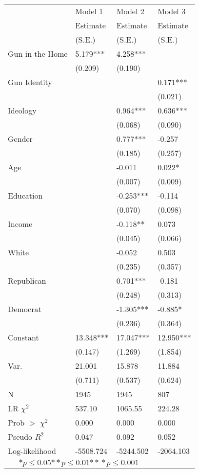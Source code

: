 \documentclass[a0,landscape]{a0poster}
\begin{document}
\begin{multicols}{4}
\begin{center}
\begin{tabular}{*{4}{l}}
     &  Model 1	&  Model 2 & Model 3\tabularnewline
   & Estimate & Estimate & Estimate \tabularnewline
    & (S.E.) & (S.E.)& (S.E.)\tabularnewline
 \hline
 \hline
  Gun in the Home    		& 5.179*** 	& 4.258*** 	& \tabularnewline
     										&  (0.209) 	&  (0.190) 		& \tabularnewline
  Gun Identity    			& 				 	&  						& 0.171***\tabularnewline
     										&  					&   					& (0.021)\tabularnewline
  Ideology    					&  					& 0.964*** 		& 0.636***\tabularnewline
     										&   				&  (0.068) 		& (0.090)\tabularnewline
  Gender    						&  					& 0.777*** 	  & -0.257\tabularnewline
     										&   				&  (0.185)  	& (0.257)\tabularnewline
  Age     							&  					& -0.011 		& 0.022*\tabularnewline
     										&   				&  (0.007)  	& (0.009)\tabularnewline
  Education     				&  				 	& -0.253***		& -0.114\tabularnewline
    										&  		 		 	&  (0.070)  	& (0.098)\tabularnewline
  Income    						&  					& -0.118**  	& 0.073\tabularnewline
     										&   				&  (0.045)  	& (0.066)\tabularnewline
	White									&						& -0.052			&	0.503\tabularnewline
												&						& (0.235)			&	(0.357)	\tabularnewline
  Republican    				&  					& 0.701*** 		& -0.181\tabularnewline
     										&   				&  (0.248)  	& (0.313)\tabularnewline
  Democrat     					&     			& -1.305*** 	& -0.885*\tabularnewline
     										&   				&  (0.236)  	& (0.364)\tabularnewline
  Constant	    				&	13.348*** &	17.047*** 	& 12.950***\tabularnewline
     										&  (0.147) 	&  (1.269) 		& (1.854)\tabularnewline
 \hline
  Var.					& 21.001		&		15.878						& 11.884\\
  	 						& (0.711) 	&  (0.537)						& (0.624)\\
\hline
 N 	 						& 1945 			& 1945  				& 807 \tabularnewline
 LR $\chi^2$    & 537.10   	& 1065.55   		& 224.28 \tabularnewline
 Prob $>$ $\chi^2$ & 0.000  & 0.000  				& 0.000  \tabularnewline
 Pseudo $R^2$   & 0.047   	& 0.092   			& 0.052 \tabularnewline
 Log-likelihood & -5508.724 & -5244.502   	& -2064.103 \tabularnewline
 \hline
\hline
 
 \multicolumn{3}{c}{${*  p}\le 0.05$${*\!\!*  p}\le 0.01$${*\!\!*\!\!*  p}\le 0.001$}\tabularnewline
 \end{tabular}
\end{center}\vspace{1cm}



\end{multicols}
\end{document}
